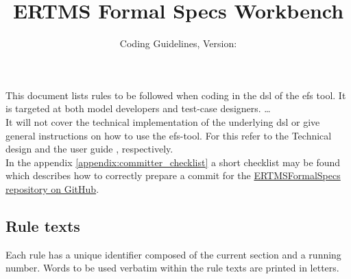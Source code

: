 \documentclass[draft]{efsguide}
\renewcommand{\docTitle}{ERTMS Formal Specs Workbench}
\renewcommand{\docSubTitle}{Coding Guidelines}
\begin{document}
\title{\docTitle}
\subtitle{\docSubTitle, Version: \vhCurrentVersion}
\date{\vhCurrentDate}
\author{\vhListAllAuthorsLongWithAbbrev}
\maketitle

\begin{versionhistory}
\end{versionhistory}



\newpage
\tableofcontents
\newpage



This document lists rules to be followed when coding in the \gls{dsl} of the \gls{efs} tool. It is targeted at both model developers and test-case designers. \ldots\\
It will not cover the technical implementation of the underlying \gls{dsl} or give general instructions on how to use the \gls{efs}-tool. For this refer to the Technical design \cite{efstechdesign} and the user guide \cite{efsuserguide}, respectively.\\

In the appendix \ref{appendix:committer_checklist} a short checklist may be found which describes how to correctly prepare a commit for the \href{https://github.com/openETCS/ERTMSFormalSpecs/}{ERTMSFormalSpecs repository on GitHub}.\\




\subsection*{Rule texts}
Each rule has a unique identifier composed of the current section and a running number. Words to be used verbatim within the rule texts are printed in  letters. 
\end{document}

